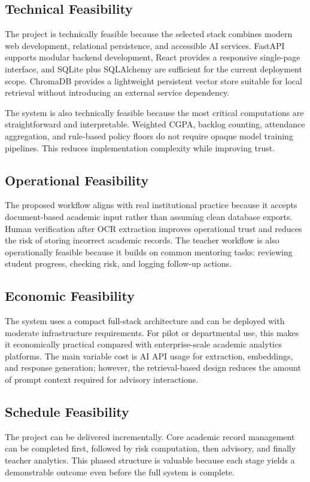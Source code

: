 \subsection{Technical Feasibility}
The project is technically feasible because the selected stack combines modern web development, relational persistence, and accessible AI services. FastAPI supports modular backend development, React provides a responsive single-page interface, and SQLite plus SQLAlchemy are sufficient for the current deployment scope. ChromaDB provides a lightweight persistent vector store suitable for local retrieval without introducing an external service dependency.

The system is also technically feasible because the most critical computations are straightforward and interpretable. Weighted CGPA, backlog counting, attendance aggregation, and rule-based policy floors do not require opaque model training pipelines. This reduces implementation complexity while improving trust.

\subsection{Operational Feasibility}
The proposed workflow aligns with real institutional practice because it accepts document-based academic input rather than assuming clean database exports. Human verification after OCR extraction improves operational trust and reduces the risk of storing incorrect academic records. The teacher workflow is also operationally feasible because it builds on common mentoring tasks: reviewing student progress, checking risk, and logging follow-up actions.

\subsection{Economic Feasibility}
The system uses a compact full-stack architecture and can be deployed with moderate infrastructure requirements. For pilot or departmental use, this makes it economically practical compared with enterprise-scale academic analytics platforms. The main variable cost is AI API usage for extraction, embeddings, and response generation; however, the retrieval-based design reduces the amount of prompt context required for advisory interactions.

\subsection{Schedule Feasibility}
The project can be delivered incrementally. Core academic record management can be completed first, followed by risk computation, then advisory, and finally teacher analytics. This phased structure is valuable because each stage yields a demonstrable outcome even before the full system is complete.

